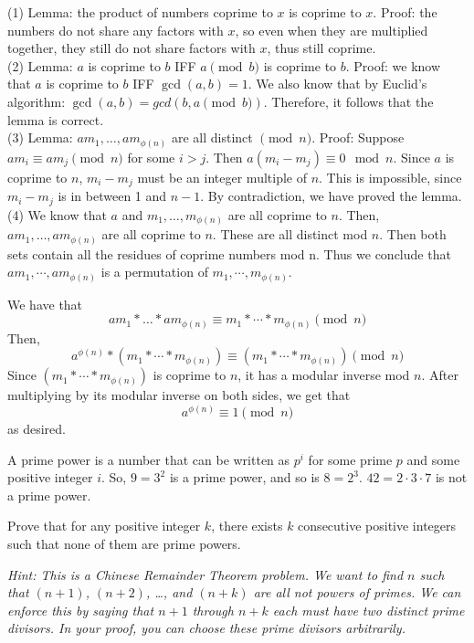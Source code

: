 \documentclass[11pt]{article}
\begin{document}
\begin{solution}\begin{Parts}\Part 
(1) Lemma: the product of numbers coprime to $x$ is coprime to $x$.
Proof: the numbers do not share any factors with $x$, so even when they are multiplied together, they still do not share factors with $x$, thus still coprime.
\\(2) Lemma: $a$ is coprime to $b$ IFF $a\pmod{b}$ is coprime to $b$.
Proof: we know that $a$ is coprime to $b$ IFF $\gcd(a,b)=1$. 
We also know that by Euclid's algorithm: $\gcd(a,b)=gcd(b,a\pmod{b})$.
Therefore, it follows that the lemma is correct.
\\(3) Lemma: $am_1,\dots,am_{\phi(n)}$ are all distinct $\pmod{n}$.
Proof: Suppose $am_i\equiv am_j\pmod{n}$ for some $i>j$.
Then $a(m_i-m_j)\equiv0\mod{n}$.
Since $a$ is coprime to $n$, $m_i-m_j$ must be an integer multiple of $n$.
This is impossible, since $m_i-m_j$ is in between 1 and $n-1$.
By contradiction, we have proved the lemma.
\\(4) We know that $a$ and $m_1,\dots,m_{\phi(n)}$ are all coprime to $n$.
Then, $am_1,\dots,am_{\phi(n)}$ are all coprime to $n$.
These are all distinct mod $n$. 
Then both sets contain all the residues of coprime numbers mod n.
Thus we conclude that 
${am_1,\cdots,am_{\phi(n)}}$ is a permutation of ${m_1,\cdots,m_{\phi(n)}}$.

\Part 
We have that 
$$am_1*\dots* am_{\phi(n)}\equiv m_1*\cdots*m_{\phi(n)}\pmod{n}$$
Then, 
$$a^{\phi(n)}*(m_1*\cdots*m_{\phi(n)})\equiv(m_1*\cdots*m_{\phi(n)})\pmod{n}$$
Since $(m_1*\cdots*m_{\phi(n)})$ is coprime to $n$, it has a modular inverse mod $n$. 
After multiplying by its modular inverse on both sides, we get that
$$a^{\phi(n)}\equiv1\pmod{n}$$
as desired.
\end{Parts}\end{solution}\newpage


A prime power is a number that can be written as $p^i$ for some prime $p$ and some
positive integer $i$. So, $9 = 3^2$ is a prime power, and so is $8 = 2^3$. $42 = 2 \cdot 3 \cdot 7$ is not
a prime power.

Prove that for any positive integer $k$, there exists $k$ consecutive positive integers
such that none of them are prime powers.

\emph{Hint: This is a Chinese Remainder Theorem problem. We want to find $n$ such that $(n + 1)$, $(n + 2)$, \ldots, and $(n + k)$ are all not powers of primes. We can enforce this by saying that $n + 1$ through $n + k$ each must have two distinct prime divisors. In your proof, you can choose these prime divisors arbitrarily.}
\end{document}
